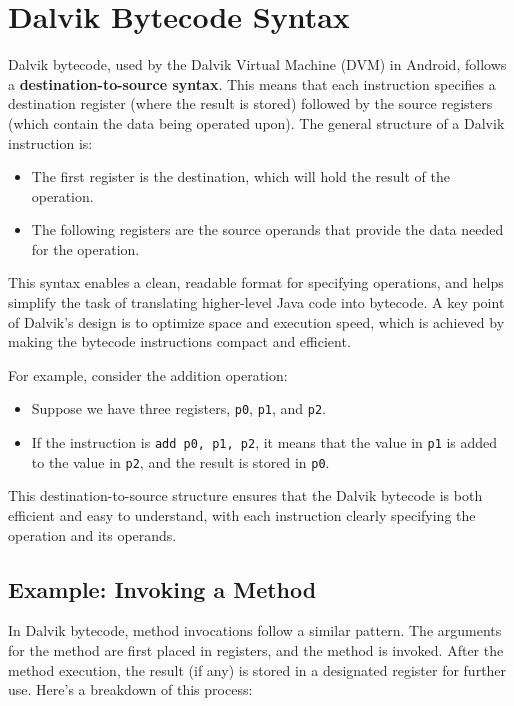 \documentclass{article}
\begin{document}
\section{Dalvik Bytecode Syntax}
Dalvik bytecode, used by the Dalvik Virtual Machine (DVM) in Android, follows a \textbf{destination-to-source syntax}. This means that each instruction specifies a destination register (where the result is stored) followed by the source registers (which contain the data being operated upon). The general structure of a Dalvik instruction is:

\begin{itemize}
    \item The first register is the destination, which will hold the result of the operation.
    \item The following registers are the source operands that provide the data needed for the operation.
\end{itemize}

This syntax enables a clean, readable format for specifying operations, and helps simplify the task of translating higher-level Java code into bytecode. A key point of Dalvik's design is to optimize space and execution speed, which is achieved by making the bytecode instructions compact and efficient.

For example, consider the addition operation:

\begin{itemize}
    \item Suppose we have three registers, \texttt{p0}, \texttt{p1}, and \texttt{p2}.
    \item If the instruction is \texttt{add p0, p1, p2}, it means that the value in \texttt{p1} is added to the value in \texttt{p2}, and the result is stored in \texttt{p0}.
\end{itemize}

This destination-to-source structure ensures that the Dalvik bytecode is both efficient and easy to understand, with each instruction clearly specifying the operation and its operands.

\subsection{Example: Invoking a Method}
In Dalvik bytecode, method invocations follow a similar pattern. The arguments for the method are first placed in registers, and the method is invoked. After the method execution, the result (if any) is stored in a designated register for further use. Here's a breakdown of this process:
\end{document}

